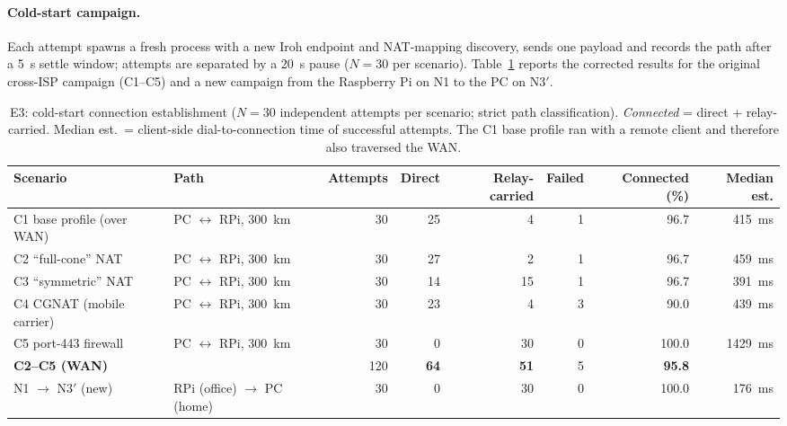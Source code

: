 \documentclass[a4paper,fleqn]{cas-dc}
\begin{document}
\paragraph{Cold-start campaign.} Each attempt spawns a fresh process with a new Iroh endpoint and NAT-mapping discovery, sends one payload and records the path after a 5~s settle window; attempts are separated by a 20~s pause ($N{=}30$ per scenario). Table~\ref{tab:e3est} reports the corrected results for the original cross-ISP campaign (C1--C5) and a new campaign from the Raspberry Pi on N1 to the PC on N3$'$.

\begin{table}[t]
\centering
\caption{E3: cold-start connection establishment ($N{=}30$ independent attempts per scenario; strict path classification). \emph{Connected} = direct + relay-carried. Median est.\ = client-side dial-to-connection time of successful attempts. The C1 base profile ran with a remote client and therefore also traversed the WAN.}
\label{tab:e3est}
\scriptsize
\setlength{\tabcolsep}{4pt}
\begin{tabular}{l l r r r r r r}
\toprule
\textbf{Scenario} & \textbf{Path} & \textbf{Attempts} & \textbf{Direct} & \textbf{Relay-carried} & \textbf{Failed} & \textbf{Connected (\%)} & \textbf{Median est.} \\
\midrule
C1 base profile (over WAN)   & PC $\leftrightarrow$ RPi, 300~km & 30 & 25 & 4  & 1 & 96.7  & 415~ms \\
C2 ``full-cone'' NAT         & PC $\leftrightarrow$ RPi, 300~km & 30 & 27 & 2  & 1 & 96.7  & 459~ms \\
C3 ``symmetric'' NAT         & PC $\leftrightarrow$ RPi, 300~km & 30 & 14 & 15 & 1 & 96.7  & 391~ms \\
C4 CGNAT (mobile carrier)    & PC $\leftrightarrow$ RPi, 300~km & 30 & 23 & 4  & 3 & 90.0  & 439~ms \\
C5 port-443 firewall         & PC $\leftrightarrow$ RPi, 300~km & 30 & 0  & 30 & 0 & 100.0 & 1429~ms \\
\midrule
\textbf{C2--C5 (WAN)}        &                         & 120 & \textbf{64} & \textbf{51} & 5 & \textbf{95.8} & \\
\midrule
N1 $\to$ N3$'$ (new)         & RPi (office) $\to$ PC (home) & 30 & 0 & 30 & 0 & 100.0 & 176~ms \\
\bottomrule
\end{tabular}
\end{table}
\end{document}
